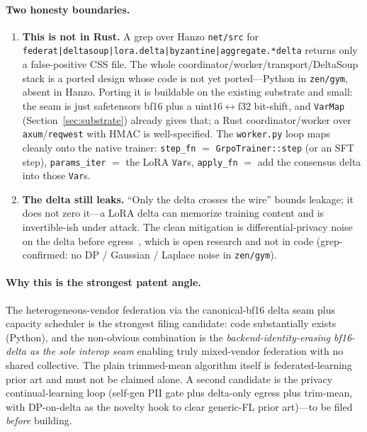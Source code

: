 \documentclass[11pt]{article}
\begin{document}
\paragraph{Two honesty boundaries.}
\begin{enumerate}
    \item \textbf{This is not in Rust.} A grep over Hanzo \texttt{net/src} for \texttt{federat}\discretionary{}{}{}\texttt{|deltasoup}\discretionary{}{}{}\texttt{|lora.delta}\discretionary{}{}{}\texttt{|byzantine}\discretionary{}{}{}\texttt{|aggregate.*delta} returns only a false-positive CSS file. The whole coordinator/worker/transport/DeltaSoup stack is a ported design whose code is not yet ported---Python in \texttt{zen/gym}, absent in Hanzo. Porting it is buildable on the existing substrate and small: the seam is just safetensors bf16 plus a uint16$\leftrightarrow$f32 bit-shift, and \texttt{VarMap} (Section~\ref{sec:substrate}) already gives that; a Rust coordinator/worker over \texttt{axum}/\texttt{reqwest} with HMAC is well-specified. The \texttt{worker.py} loop maps cleanly onto the native trainer: \texttt{step\_fn} $=$ \texttt{GrpoTrainer::step} (or an SFT step), \texttt{params\_iter} $=$ the LoRA \texttt{Var}s, \texttt{apply\_fn} $=$ add the consensus delta into those \texttt{Var}s.
    \item \textbf{The delta still leaks.} ``Only the delta crosses the wire'' bounds leakage; it does not zero it---a LoRA delta can memorize training content and is invertible-ish under attack. The clean mitigation is differential-privacy noise on the delta before egress~\cite{dpsgd}, which is open research and not in code (grep-confirmed: no DP / Gaussian / Laplace noise in \texttt{zen/gym}).
\end{enumerate}

\paragraph{Why this is the strongest patent angle.}
The heterogeneous-vendor federation via the canonical-bf16 delta seam plus capacity scheduler is the strongest filing candidate: code substantially exists (Python), and the non-obvious combination is the \emph{backend-identity-erasing bf16-delta as the sole interop seam} enabling truly mixed-vendor federation with no shared collective. The plain trimmed-mean algorithm itself is federated-learning prior art and must not be claimed alone. A second candidate is the privacy continual-learning loop (self-gen PII gate plus delta-only egress plus trim-mean, with DP-on-delta as the novelty hook to clear generic-FL prior art)---to be filed \emph{before} building.
\end{document}
